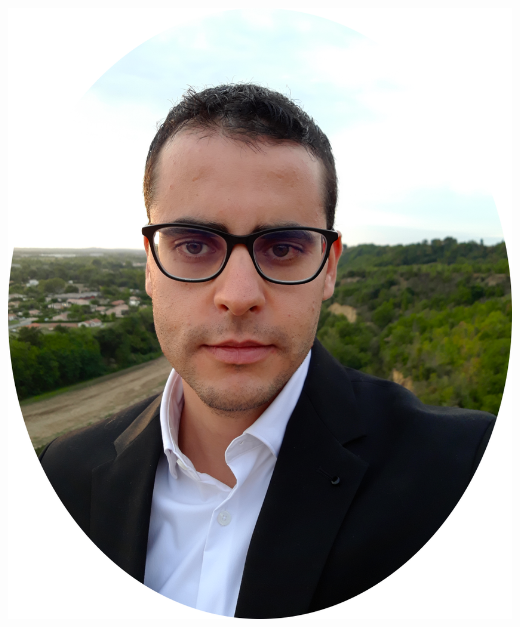 \begin{minipage}{0.45\textwidth}
\begin{flushright}
\includegraphics[scale=0.15]{img/me3.png}~~~~~~~~
\end{flushright}
\end{minipage}


\tair

\sectionline{}
